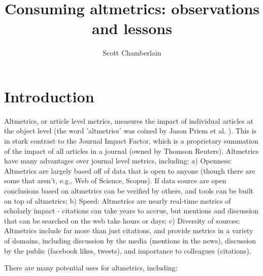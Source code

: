 \documentclass[letterpaper,superscriptaddress,showkeys,longbibliography]{revtex4-1}\usepackage{graphicx, color}
\begin{document}

\title{Consuming altmetrics: observations and lessons}

\author{Scott Chamberlain}


\maketitle

\section*{Introduction}

Altmetrics, or article level metrics, measures the impact of individual articles at the object level (the word 'altmetrics' was coined by Jason Priem et al. \cite{priem2012}). This is in stark contrast to the Journal Impact Factor, which is a proprietary summation of the impact of all articles in a journal (owned by Thomson Reuters). Altmetrics have many advantages over journal level metrics, including: a) Openness: Altmetrics are largely based off of data that is open to anyone (though there are some that aren't, e.g., Web of Science, Scopus). If data source are open conclusions based on altmetrics can be verified by others, and tools can be built on top of altmetrics; b) Speed: Altmetrics are nearly real-time metrics of scholarly impact \cite{priem2012} - citations can take years to accrue, but mentions and discussion that can be searched on the web take hours or days; c) Diversity of sources: Altmetrics include far more than just citations, and provide metrics in a variety of domains, including discussion by the media (mentions in the news), discussion by the public (facebook likes, tweets), and importance to colleagues (citations).

There are many potential uses for altmetrics, including: 
\end{document}
